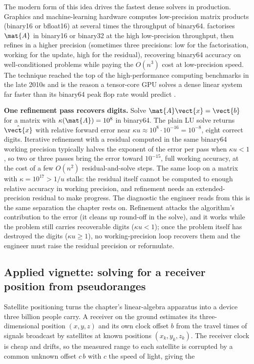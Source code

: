 The modern form of this idea drives the fastest dense solvers in production.
Graphics and machine-learning hardware computes low-precision matrix
products (binary16 or bfloat16) at several times the throughput of binary64.
 factorises $\mat{A}$ in
binary16 or binary32 at the high low-precision throughput, then refines in
a higher precision (sometimes three precisions: low for the factorisation,
working for the update, high for the residual), recovering binary64 accuracy
on well-conditioned problems while paying the $O(n^{3})$ cost at
low-precision speed. The technique reached the top of the high-performance
computing benchmarks in the late 2010s and is the reason a tensor-core GPU
solves a dense linear system far faster than its binary64 peak flop rate
would predict \cite[ch.~12]{text:higham-numerical}.

\begin{example}
\textbf{One refinement pass recovers digits.} Solve $\mat{A}\vect{x} =
\vect{b}$ for a matrix with $\kappa(\mat{A}) = 10^{8}$ in binary64. The
plain LU solve returns $\hat{\vect{x}}$ with relative forward error near
$\kappa u \approx 10^{8} \cdot 10^{-16} = 10^{-8}$, eight correct digits.
Iterative refinement with a residual computed in the same binary64 working
precision typically halves the exponent of the error per pass when
$\kappa u < 1$, so two or three passes bring the error toward $10^{-15}$,
full working accuracy, at the cost of a few $O(n^{2})$ residual-and-solve
steps. The same loop on a matrix with $\kappa = 10^{17} > 1/u$ stalls: the
residual itself cannot be computed to enough relative accuracy in working
precision, and refinement needs an extended-precision residual to make
progress. The diagnostic the engineer reads from this is the same separation
the chapter rests on. Refinement attacks the algorithm's contribution to
the error (it cleans up round-off in the solve), and it works while the
problem still carries recoverable digits ($\kappa u < 1$); once the problem
itself has destroyed the digits ($\kappa u \geq 1$), no working-precision
loop recovers them and the engineer must raise the residual precision or
reformulate.
\end{example}

\subsection{Applied vignette: solving for a receiver position from pseudoranges}

Satellite positioning turns the chapter's linear-algebra apparatus into a
device three billion people carry. A receiver on the ground estimates its
three-dimensional position $(x, y, z)$ and its own clock offset $b$ from the
travel times of signals broadcast by satellites at known positions
$(x_{k}, y_{k}, z_{k})$. The receiver clock is cheap and drifts, so the
measured range to each satellite is corrupted by a common unknown offset
$c\,b$ with $c$ the speed of light, giving the 

